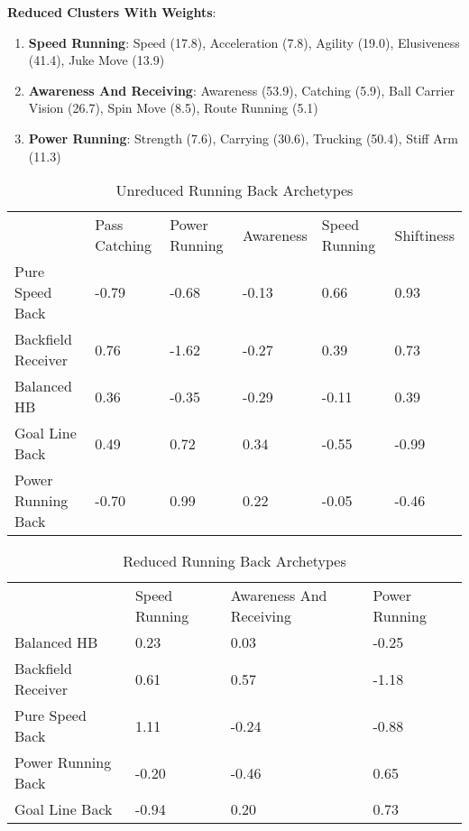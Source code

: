 \documentclass[11pt]{article}
\begin{document}
\textbf{Reduced Clusters With Weights}:

\begin{enumerate}
\item{\textbf{Speed Running}}: Speed (17.8), Acceleration (7.8), Agility (19.0), Elusiveness (41.4), Juke Move (13.9)
\item{\textbf{Awareness And Receiving}}: Awareness (53.9), Catching (5.9), Ball Carrier Vision (26.7), Spin Move (8.5), Route Running (5.1)
\item{\textbf{Power Running}}: Strength (7.6), Carrying (30.6), Trucking (50.4), Stiff Arm (11.3)
\end{enumerate}

\begin{table}[]
\centering
\caption{Unreduced Running Back Archetypes}
\label{UnreducedRunningBack}
\begin{tabular}{llllll}
                   & Pass Catching & Power Running & Awareness & Speed Running & Shiftiness \\
Pure Speed Back    & -0.79         & -0.68         & -0.13     & 0.66          & 0.93       \\
Backfield Receiver & 0.76          & -1.62         & -0.27     & 0.39          & 0.73       \\
Balanced HB        & 0.36          & -0.35         & -0.29     & -0.11         & 0.39       \\
Goal Line Back     & 0.49          & 0.72          & 0.34      & -0.55         & -0.99      \\
Power Running Back & -0.70         & 0.99          & 0.22      & -0.05         & -0.46     
\end{tabular}
\end{table}

\begin{table}[]
\centering
\caption{Reduced Running Back Archetypes}
\label{ReducedRunningBack}
\begin{tabular}{llll}
                   & Speed Running & Awareness And Receiving & Power Running \\
Balanced HB        & 0.23          & 0.03                    & -0.25         \\
Backfield Receiver & 0.61          & 0.57                    & -1.18         \\
Pure Speed Back    & 1.11          & -0.24                   & -0.88         \\
Power Running Back & -0.20         & -0.46                   & 0.65          \\
Goal Line Back     & -0.94         & 0.20                    & 0.73         
\end{tabular}
\end{table}
\end{document}
